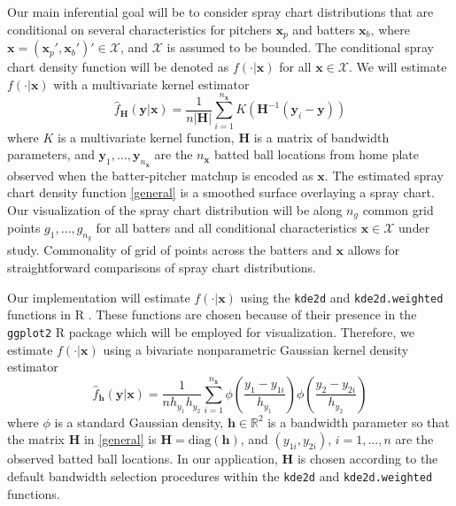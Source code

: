 \documentclass[11pt]{article}
\newcommand{\R}{\mathbb{R}}
\newcommand{\X}{\mathcal{X}}
\newcommand{\Hbf}{\textbf{H}}
\newcommand{\y}{\textbf{y}}
\newcommand{\x}{\textbf{x}}
\newcommand{\h}{\textbf{h}}
\begin{document}
Our main inferential goal will be to consider spray chart distributions that are conditional on several characteristics for pitchers $\x_p$ and batters $\x_b$, where $\x = (\x_p',\x_b')' \in \X$, and $\X$ is assumed to be bounded. The conditional spray chart density function will be denoted as $f(\cdot|\x)$ for all $\x \in \X$. We will estimate $f(\cdot|\x)$ with a multivariate kernel estimator
\begin{equation} \label{general}
  \hat f_\Hbf(\y|\x) = \frac{1}{n|\Hbf|}\sum_{i=1}^{n_\x} K\left(\Hbf^{-1}(\y_i - \y)\right)
\end{equation}
where $K$ is a multivariate kernel function, $\Hbf$ is a matrix of bandwidth parameters, and 
$\y_1,\ldots,\y_{n_\x}$ are the $n_\x$ batted ball locations from home plate observed when the batter-pitcher matchup is encoded as $\x$. The estimated spray chart density function \eqref{general} is a smoothed surface overlaying a spray chart. Our visualization of the spray chart distribution will be along $n_g$ common grid points $g_1,\ldots,g_{n_g}$ for all batters and all conditional characteristics $\x \in \X$ under study. Commonality of grid of points across the batters and $\x$ allows for straightforward comparisons of spray chart distributions.

Our implementation will estimate $f(\cdot|\x)$ using the \texttt{kde2d} and \texttt{kde2d.weighted} functions in R \citep{MASS, ggtern}. 
These functions are chosen because of their presence 
in the \texttt{ggplot2} R package \citep{ggplot2} which will be employed for visualization. Therefore, we estimate $f(\cdot|\x)$ using a bivariate nonparametric Gaussian kernel density estimator
\begin{equation} \label{spraydens}
  \hat f_\h(\y|\x) = 
    \frac{1}{n h_{y_1}h_{y_2}}\sum_{i=1}^{n_\x} \phi\left(\frac{y_1 - y_{1i}}{h_{y_1}}\right)
      \phi\left(\frac{y_2 - y_{2i}}{h_{y_2}}\right)
\end{equation}
where $\phi$ is a standard Gaussian density, $\h \in \R^2$ is a bandwidth parameter so that the matrix $\Hbf$ in \eqref{general} is $\Hbf = \text{diag}(\h)$, and $(y_{1i},y_{2i})$, $i = 1,\ldots,n$ are the observed batted ball locations. In our application, $\Hbf$ is chosen according to the default bandwidth selection procedures within the \texttt{kde2d} and \texttt{kde2d.weighted} functions.


\end{document}
